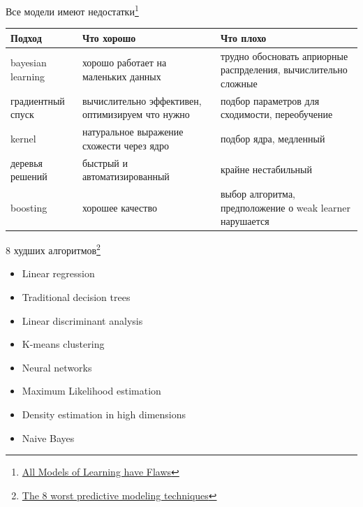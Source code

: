 \documentclass[aspectratio=169]{beamer}
\begin{document}
\begin{frame}{Все модели имеют недостатки\footnote{\href{http://web.archive.org/web/20140326142656/http://hunch.net/?p=224}{All Models of Learning have Flaws}}}

\begin{small}
\begin{tabular}{| p{2cm} | p{3.6cm} | p{3.6cm} |}
\hline
Подход & Что хорошо & Что плохо \\
\hline
\hline
bayesian learning & хорошо работает на маленьких данных & трудно обосновать априорные распрделения, вычислительно сложные \\ \hline
градиентный спуск & вычислительно эффективен, оптимизируем что нужно & подбор параметров для сходимости, переобучение \\ \hline
kernel & натуральное выражение схожести через ядро & подбор ядра, медленный \\ \hline
деревья решений & быстрый и автоматизированный & крайне нестабильный \\ \hline
boosting & хорошее качество & выбор алгоритма, предположение о weak learner нарушается  \\
\hline
\end{tabular}
\end{small}

\end{frame}

\begin{frame}{8 худших алгоритмов\footnote{\href{http://www.analyticbridge.com/profiles/blogs/the-8-worst-predictive-modeling-techniques}{The 8 worst predictive modeling techniques}}}

\begin{itemize}
\item Linear regression
\item Traditional decision trees
\item Linear discriminant analysis
\item K-means clustering
\item Neural networks
\item Maximum Likelihood estimation
\item Density estimation in high dimensions
\item Naive Bayes
\end{itemize}

\end{frame}
\end{document}
